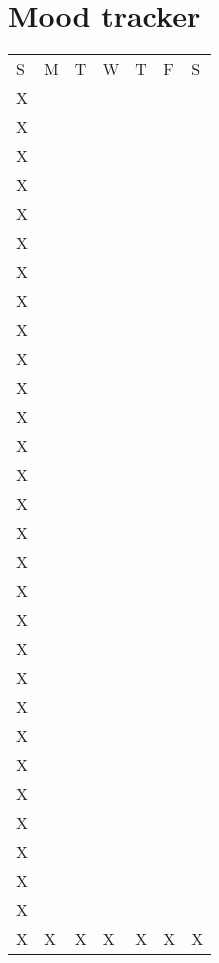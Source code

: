\documentclass[a4paper]{article}
\begin{document}
\section{Mood tracker}
\begin{table}[htp]
\begin{tabular}{lllllll}
S & M & T & W & T & F & S \\
X &   &   &   &   &   &   \\
X &   &   &   &   &   &   \\
X &   &   &   &   &   &   \\
X &   &   &   &   &   &   \\
X &   &   &   &   &   &   \\
X &   &   &   &   &   &   \\
X &   &   &   &   &   &   \\
X &   &   &   &   &   &   \\
X &   &   &   &   &   &   \\
X &   &   &   &   &   &   \\
X &   &   &   &   &   &   \\
X &   &   &   &   &   &   \\
X &   &   &   &   &   &   \\
X &   &   &   &   &   &   \\
X &   &   &   &   &   &   \\
X &   &   &   &   &   &   \\
X &   &   &   &   &   &   \\
X &   &   &   &   &   &   \\
X &   &   &   &   &   &   \\
X &   &   &   &   &   &   \\
X &   &   &   &   &   &   \\
X &   &   &   &   &   &   \\
X &   &   &   &   &   &   \\
X &   &   &   &   &   &   \\
X &   &   &   &   &   &   \\
X &   &   &   &   &   &   \\
X &   &   &   &   &   &   \\
X &   &   &   &   &   &   \\
X &   &   &   &   &   &   \\
X & X & X & X & X & X & X
\end{tabular}
\end{table}
\newpage
\end{document}
